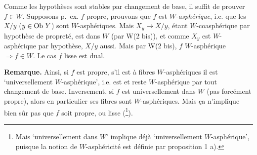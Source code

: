 \leavevmode{}Comme les hypothèses sont stables par changement de base, il suffit de prouver $f\in W$. Supposons p.~ex. $f$ propre, prouvons que $f$ est $W$-\textit{asphérique}, i.e. que les $X/y$ ($y\in\operatorname{Ob}\,Y$) sont $W$-asphériques. Mais $X_y\longrightarrow X/y$, étant $W$-coasphérique par hypothèse de propreté, est dans $W$ (par W(2 bis)), et comme $X_y$ est $W$-asphérique par hypothèse, $X/y$ aussi. Mais par W(2 bis), $f$ $W$-asphérique $\Longrightarrow f\in W$. Le cas $f$ lisse est dual.

\textbf{Remarque.} Ainsi, si $f$ est propre, s'il est à fibres $W$-asphériques il est `universellement $W$-asphérique', i.e. est et reste $W$-asphérique par tout changement de base. Inversement, si $f$ est universellement dans $W$ (pas forcément propre), alors en particulier ses fibres sont $W$-asphériques. Mais ça n'implique bien sûr pas que $f$ soit propre, ou lisse (\footnote[44]{Mais `universellement dans $W$' implique déjà `universellement $W$-asphérique', puisque la notion de $W$-asphéricité est définie par proposition 1 a).}).

